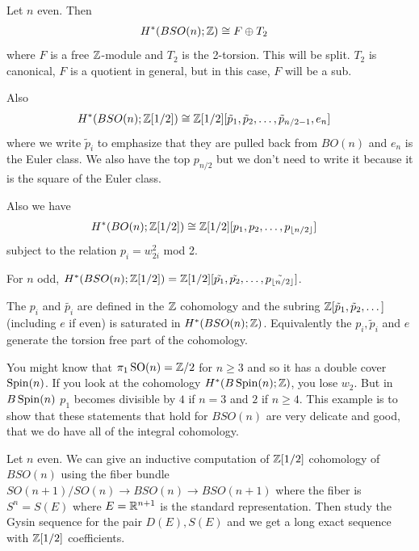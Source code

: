 \documentclass[12pt]{article}
\begin{document}
\begin{theorem}
    Let $n$ even. Then \begin{align*}
        H^*(BSO(n);\mathbb{Z}) &\cong F \oplus T_2
    \end{align*} where $F$ is a free $\mathbb{Z}$-module and $T_2$ is the 2-torsion. 
This will be split. $T_2$ is canonical, $F$ is a quotient in general, but in this case, $F$ will be a sub.

Also \begin{align*}
    H^*(BSO(n);\mathbb{Z}[1/2]) &\cong \mathbb{Z}[1/2][\tilde{p}_1, \tilde{p}_2, \dots, \tilde{p}_{n/2 - 1}, e_{n}]
\end{align*} where we write $\tilde{p}_i$ to emphasize that they are pulled back from $BO(n)$ and $e_n$ is the Euler class. We also have the top $p_{n/2}$ but we don't need to write it because it is the square of the Euler class. 

Also we have \begin{align*}
    H^*(BO(n);\mathbb{Z}[1/2]) &\cong \mathbb{Z}[1/2][p_1, p_2, \dots, p_{\lfloor n/2 \rfloor}]
\end{align*} subject to the relation $p_i = w_{2i}^2$ mod 2. 

For $n$ odd, $H^*(BSO(n);\mathbb{Z}[1/2]) = \mathbb{Z}[1/2][\tilde{p_1}, \tilde{p_2}, \dots, \tilde{p_{\lfloor n/2 \rfloor}}]$.
\end{theorem}

\begin{remark}
    The $p_i$ and $\tilde{p_i}$ are defined in the $\mathbb{Z}$ cohomology and the subring $\mathbb{Z}[\tilde{p}_1, \tilde{p}_2, \dots]$ (including $e$ if even) is saturated in $H^*(BSO(n);\mathbb{Z})$. Equivalently the $p_i, \tilde{p}_i$ and $e$ generate the torsion free part of the cohomology. 
\end{remark}

You might know that $\pi_1 \operatorname{SO}(n) = \mathbb{Z}/2$ for $n\geq 3$ and so it has a double cover $\operatorname{Spin}(n)$. If you look at the cohomology $H^*(B\operatorname{Spin}(n);\mathbb{Z})$, you lose  $w_2$. But in $B \operatorname{Spin}(n)$ $p_1$ becomes divisible by $4$ if $n=3$ and $2$ if $n\geq 4$. This example is to show that these statements that hold for $BSO(n)$ are very delicate and good, that we do have all of the integral cohomology.


Let $n$ even. We can give an inductive computation of $\mathbb{Z}[1/2]$ cohomology of $BSO(n)$ using the fiber bundle $SO(n+1)/SO(n) \to BSO(n) \to BSO(n+1)$ where the fiber is $S^n = S(E)$ where $E = \mathbb{R}^{n+1}$ is the standard representation. Then study the Gysin sequence for the pair $D(E),S(E)$ and we get a long exact sequence with $\mathbb{Z}[1/2]$ coefficients.
\end{document}

